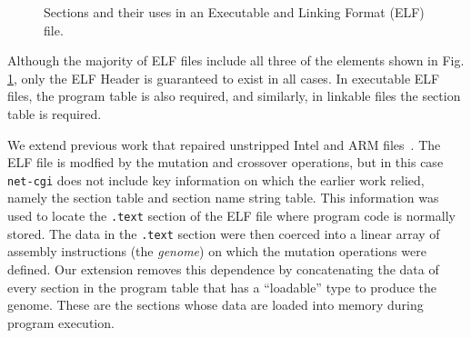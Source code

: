 \documentclass{sigcomm-alternate}
\begin{document}
\begin{figure}[htb]
  \centering
\caption{\label{elf}Sections and their uses in an Executable and
  Linking Format (ELF) file.}
\end{figure}

\noindent Although the majority of ELF files
include all three of the elements shown in Fig. \ref{elf}, only the
ELF Header is guaranteed to exist in all cases.  In executable ELF
files, the program table is also required, and similarly, in linkable
files the section table is required.

We extend previous work that repaired unstripped Intel and ARM
files~\cite{schulte2013embedded}.  The ELF file is modfied by the
mutation and crossover operations, but in this case \texttt{net-cgi}
does not include key information on which the earlier work relied,
namely the section table and section name string table.  This
information was used to locate the \texttt{.text} section of the ELF
file where program code is normally stored.  The data in the
\texttt{.text} section were then coerced into a linear array of
assembly instructions (the \emph{genome}) on which the mutation
operations were defined.  Our extension removes this dependence by
concatenating the data of every section in the program table that has
a ``loadable'' type to produce the genome.  These are the sections
whose data are loaded into memory during program execution.
\end{document}
